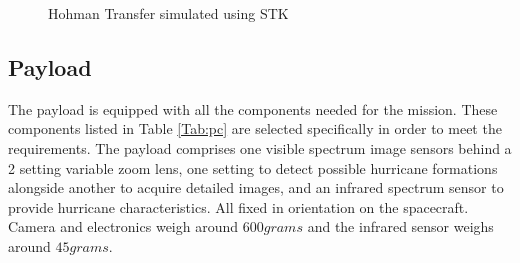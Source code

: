 \begin{figure}
    \centering
    \label{fig:t1}
    \qquad
    \label{fig:t2}
    \caption{Hohman Transfer simulated using STK}
    \label{fig:hohfig}
\end{figure}
\FloatBarrier
\subsection{Payload}
The payload is equipped with all the components needed for the mission. These components listed in Table \ref{Tab:pc} are selected specifically in order to meet the requirements. The payload comprises one visible spectrum image sensors behind a 2 setting variable zoom lens, one setting to detect possible hurricane formations alongside another to acquire detailed images, and an infrared spectrum sensor to provide hurricane characteristics. All fixed in orientation on the spacecraft. Camera and electronics weigh around $600 grams$ and the infrared sensor weighs around $45 grams$.\\

